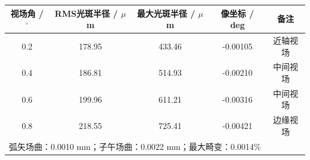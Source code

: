 \begin{table}[htbp]
    \centering
    \label{tab:obj_performance}
    \begin{tabular}{ccccc}
        \toprule
        视场角 / $^\circ$ & RMS光斑半径 / $\mu$m & 最大光斑半径 / $\mu$m & 像坐标 / deg & 备注 \\
        \midrule
        0.2 & 178.95 & 433.46 & -0.00105 & 近轴视场 \\
        0.4 & 186.81 & 514.93 & -0.00210 & 中间视场 \\
        0.6 & 199.96 & 611.21 & -0.00316 & 中间视场 \\
        0.8 & 218.55 & 725.41 & -0.00421 & 边缘视场 \\
        \midrule
        \multicolumn{5}{l}{弧矢场曲：0.0010 mm；子午场曲：0.0022 mm；最大畸变：0.0014\%} \\
        \bottomrule
    \end{tabular}
\end{table}



